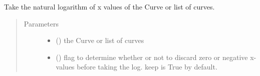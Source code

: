 \documentclass[letterpaper,10pt,english]{sphinxmanual}
\begin{document}

\begin{fulllineitems}
\label{\detokenize{pydv:pydvpy.logx}}
Take the natural logarithm of x values of the Curve or list of curves.

\begin{sphinxVerbatim}[commandchars=\\\{\}]
  
\end{sphinxVerbatim}

\begin{sphinxVerbatim}[commandchars=\\\{\}]
 
\end{sphinxVerbatim}

\begin{sphinxVerbatim}[commandchars=\\\{\}]
\PYG{p}{[}\PYG{p}{]}
\end{sphinxVerbatim}
\begin{quote}\begin{description}
\item[{Parameters}] \leavevmode\begin{itemize}
\item {} 
 ({\hyperref[\detokenize{pydv:curve.Curve}]{}}) \textendash{} the Curve or list of curves

\item {} 
 (\sphinxstyleliteralemphasis{\sphinxupquote{, }}) \textendash{} flag to determine whether or not to discard zero or negative x-values before taking the log.
keep is True by default.

\end{itemize}

\end{description}\end{quote}

\end{fulllineitems}
\end{document}

